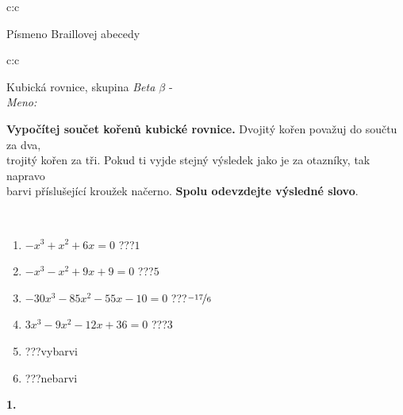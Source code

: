 \documentclass[10pt]{report}
\begin{document}
\begin{tabular}{c:c}
\begin{minipage}[c][104.5mm][t]{0.5\linewidth}
\begin{center}
\begin{minipage}{0.20\linewidth}
\begin{center}
{\small Písmeno Braillovej abecedy}
\end{center}
\end{minipage}
\end{center}
\end{minipage}
%
\end{tabular}
\newpage
\thispagestyle{empty}
\begin{tabular}{c:c}
\begin{minipage}[c][104.5mm][t]{0.5\linewidth}
\begin{center}
\vspace{7mm}
{\huge Kubická rovnice, skupina \textit{Beta $\beta$} -}\\[5mm]
\textit{Meno:}\phantom{xxxxxxxxxxxxxxxxxxxxxxxxxxxxxxxxxxxxxxxxxxxxxxxxxxxxxxxxxxxxxxxxx}\\[5mm]
\begin{minipage}{0.95\linewidth}
\textbf{Vypočítej součet kořenů kubické rovnice.} Dvojitý kořen považuj do součtu za dva,\\trojitý kořen za tři. Pokud ti vyjde stejný výsledek jako je za otazníky, tak napravo\\barvi příslušející kroužek načerno. \textbf{Spolu odevzdejte výsledné slovo}.
\end{minipage}
\\[1mm]
\begin{minipage}{0.79\linewidth}
\begin{center}
\begin{varwidth}{\linewidth}
\begin{enumerate}
\Large
\item $-x^3+x^2+6x=0$\quad \dotfill\; ???\;\dotfill \quad $1$
\item $-x^3-x^2+9x+9=0$\quad \dotfill\; ???\;\dotfill \quad $5$
\item $-30x^3-85x^2-55x-10=0$\quad \dotfill\; ???\;\dotfill \quad $\nicefrac{-17}{6}$
\item $3x^3-9x^2-12x+36=0$\quad \dotfill\; ???\;\dotfill \quad $3$
\item \quad \dotfill\; ???\;\dotfill \quad vybarvi
\item \quad \dotfill\; ???\;\dotfill \quad nebarvi
\end{enumerate}
\end{varwidth}
\end{center}
\end{minipage}
\begin{minipage}{0.20\linewidth}
\begin{center}
{\Huge\bfseries 1.} \\[2mm]

\end{center}
\end{minipage}
\end{center}
\end{minipage}
\end{tabular}
\end{document}
